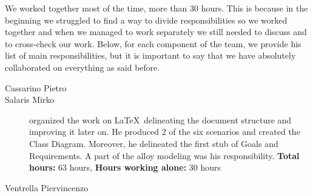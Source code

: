 We worked together most of the time, more than 30 hours. This is because in the beginning we struggled to find a way to divide responsibilities so we worked together and when we managed to work separately we still needed to discuss and to cross-check our work.\newline
Below, for each component of the team, we provide his list of main responsibilities, but it is important to say that we have absolutely collaborated on everything as said before.

\begin{description}
	\item[Cassarino Pietro] %
	\item[Salaris Mirko] organized the work on \LaTeX\ delineating the document structure and improving it later on. He produced 2 of the six scenarios and created the Class Diagram. Moreover, he delineated the first stub of Goals and Requirements. A part of the alloy modeling was his responsibility.\newline
	\textbf{Total hours:} 63 hours, \textbf{Hours working alone:} 30 hours
	\item[Ventrella Piervincenzo] %
\end{description}